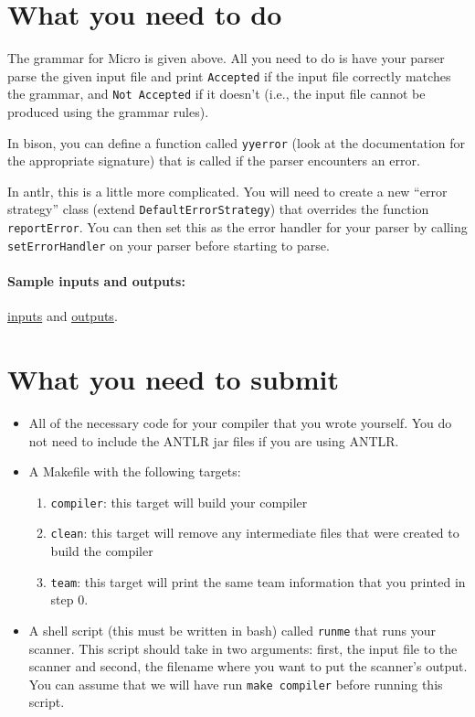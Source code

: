 \documentclass{article}
\begin{document}
\section{What you need to do}
The grammar for Micro is given above. All you need to do is have your parser parse the given input file and print \texttt{Accepted} if the input file correctly matches the grammar, and \texttt{Not Accepted} if it doesn't (i.e., the input file cannot be produced using the grammar rules).

In bison, you can define a function called \texttt{yyerror} (look at the documentation for the appropriate signature) that is called if the parser encounters an error. 

In antlr, this is a little more complicated. You will need to create a new ``error strategy'' class (extend \texttt{DefaultErrorStrategy}) that overrides the function \texttt{reportError}. You can then set this as the error handler for your parser by calling \texttt{setErrorHandler} on your parser before starting to parse.

\paragraph{Sample inputs and outputs:} \href{https://hegden.github.io/cs406/homeworks/PA2/inputs.zip}{inputs} and \href{https://hegden.github.io/cs406/homeworks/PA2/outputs.zip}{outputs}.

\section{What you need to submit}
\begin{itemize}
	\item All of the necessary code for your compiler that you wrote yourself. You do not need to include the ANTLR jar files if you are using ANTLR.

	\item A Makefile with the following targets:
		\begin{enumerate}
			\item \texttt{compiler}: this target will build your compiler
			\item \texttt{clean}: this target will remove any intermediate files that were created to build the compiler
			\item \texttt{team}: this target will print the same team information that you printed in step 0.
		\end{enumerate}
	\item A shell script (this must be written in bash) called \texttt{runme} that runs your scanner. This script should take in two arguments: first, the input file to the scanner and second, the filename where you want to put the scanner's output. You can assume that we will have run \texttt{make compiler} before running this script.
\end{itemize}
\end{document}
